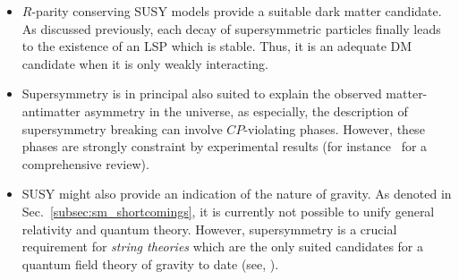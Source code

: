 \begin{itemize}
\begin{figure}[!t]
\begin{tabular}{c}
  \end{tabular}
  \caption{Comparison of the renormalization group evolution of the couplings $\alpha_{a}^{-1}$ in the SM (dashed lines) and the MSSM (solid lines) including two-loop effects. The masses of the supersymmetric particles in the MSSM are considered as a common threshold changing between 500\gev and 1.5\tev while the strong coupling constant $\alpha_{3}(m_{Z})$ is varied between 0.117 and 0.121. Taken from~\cite{Martin:1997ns}.}
  \label{fig:couplings}
\end{figure}
 \item $R$-parity conserving SUSY models provide a suitable dark matter candidate. As discussed previously, each decay of supersymmetric particles finally leads to the existence of an LSP which is stable. Thus, it is an adequate DM candidate when it is only weakly interacting.
 \item Supersymmetry is in principal also suited to explain the observed matter-antimatter asymmetry in the universe, as especially, the description of supersymmetry breaking can involve $CP$-violating phases. However, these phases are strongly constraint by experimental results (\cf for instance~\cite{Ibrahim:2007fb} for a comprehensive review).
 \item SUSY might also provide an indication of the nature of gravity. As denoted in Sec.~\ref{subsec:sm_shortcomings}, it is currently not possible to unify general relativity and quantum theory. However, supersymmetry is a crucial requirement for \textit{string theories} which are the only suited candidates for a quantum field theory of gravity to date (see, \eg\cite{RevModPhys.47.123}). 
\end{itemize} 

